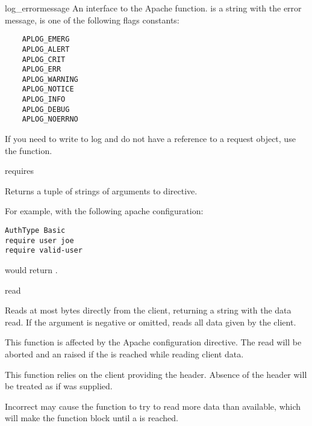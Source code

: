 \begin{methoddesc}{log_error}{message}
  An interface to the Apache 
  function.  is a string with the error message,
   is one of the following flags constants:

  \begin{verbatim}
    APLOG_EMERG
    APLOG_ALERT
    APLOG_CRIT
    APLOG_ERR
    APLOG_WARNING
    APLOG_NOTICE
    APLOG_INFO
    APLOG_DEBUG
    APLOG_NOERRNO
  \end{verbatim}            

  If you need to write to log and do not have a reference to a request object,
  use the  function.
\end{methoddesc}

\begin{methoddesc}[request]{requires}{}

  Returns a tuple of strings of arguments to  directive.
  
  For example, with the following apache configuration:
  \begin{verbatim}
AuthType Basic
require user joe
require valid-user
  \end{verbatim}
   would return .

\end{methoddesc}

\begin{methoddesc}[request]{read}{}

  Reads at most  bytes directly from the client, returning a
  string with the data read. If the  argument is negative or
  omitted, reads all data given by the client.

  This function is affected by the  Apache configuration
  directive. The read will be aborted and an 
  raised if the  is reached while reading client data.

  This function relies on the client providing the 
  header. Absence of the  header will be treated as
  if  was supplied.

  Incorrect  may cause the function to try to read
  more data than available, which will make the function block until a
   is reached.

\end{methoddesc}

